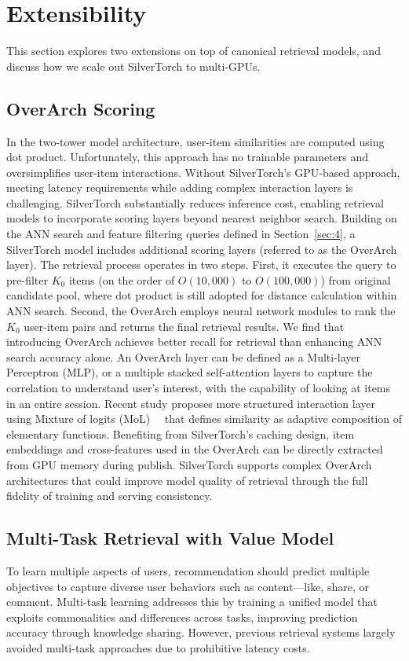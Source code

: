 \section{Extensibility}
\label{sec:5}
This section explores two extensions on top of canonical retrieval models, and discuss how we scale out SilverTorch to multi-GPUs.

\subsection{OverArch Scoring}
In the two-tower model architecture, user-item similarities are computed using dot product. Unfortunately, this approach has no trainable parameters and oversimplifies user-item interactions. Without SilverTorch's GPU-based approach, meeting latency requirements while adding complex interaction layers is challenging. SilverTorch substantially reduces inference cost, enabling retrieval models to incorporate scoring layers beyond nearest neighbor search.
Building on the ANN search and feature filtering queries defined in Section~\ref{sec:4}, a SilverTorch model includes additional scoring layers (referred to as the OverArch layer). The retrieval process operates in two steps. First, it executes the query to pre-filter $K_0$ items (on the order of $O(10{,}000)$ to $O(100{,}000)$) from original candidate pool, where dot product is still adopted for distance calculation within ANN search. Second, the OverArch employs neural network modules to rank the $K_0$ user-item pairs and returns the final retrieval results. We find that introducing OverArch achieves better recall for retrieval than enhancing ANN search accuracy alone.
An OverArch layer can be defined as a Multi-layer Perceptron (MLP), or a multiple stacked self-attention layers to capture the correlation to understand user’s interest, with the capability of looking at items in an entire session. Recent study proposes more structured interaction layer using Mixture of logits (MoL)~\cite{zhai2023revisiting}~\cite{ding2025retrieval} that defines similarity as adaptive composition of elementary functions. Benefiting from SilverTorch's caching design, item embeddings and cross-features used in the OverArch can be directly extracted from GPU memory during publish. SilverTorch supports complex OverArch architectures that could improve model quality of retrieval through the full fidelity of training and serving consistency.

\subsection{Multi-Task Retrieval with Value Model}
To learn multiple aspects of users, recommendation should predict multiple objectives to capture diverse user behaviors such as content—like, share, or comment. Multi-task learning addresses this by training a unified model that exploits commonalities and differences across tasks, improving prediction accuracy through knowledge sharing. However, previous retrieval systems largely avoided multi-task approaches due to prohibitive latency costs.


